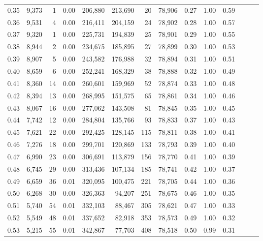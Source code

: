 \begin{tabular}{rrrrrrrrrrrrrr}
0.35 &  9,373 &      1 &  0.00 &  206,880 &  213,690 &      20 &  78,906 &  0.27 &  1.00 &      0.59 \\
0.36 &  9,531 &      4 &  0.00 &  216,411 &  204,159 &      24 &  78,902 &  0.28 &  1.00 &      0.57 \\
0.37 &  9,320 &      1 &  0.00 &  225,731 &  194,839 &      25 &  78,901 &  0.29 &  1.00 &      0.55 \\
0.38 &  8,944 &      2 &  0.00 &  234,675 &  185,895 &      27 &  78,899 &  0.30 &  1.00 &      0.53 \\
0.39 &  8,907 &      5 &  0.00 &  243,582 &  176,988 &      32 &  78,894 &  0.31 &  1.00 &      0.51 \\
0.40 &  8,659 &      6 &  0.00 &  252,241 &  168,329 &      38 &  78,888 &  0.32 &  1.00 &      0.49 \\
0.41 &  8,360 &     14 &  0.00 &  260,601 &  159,969 &      52 &  78,874 &  0.33 &  1.00 &      0.48 \\
0.42 &  8,394 &     13 &  0.00 &  268,995 &  151,575 &      65 &  78,861 &  0.34 &  1.00 &      0.46 \\
0.43 &  8,067 &     16 &  0.00 &  277,062 &  143,508 &      81 &  78,845 &  0.35 &  1.00 &      0.45 \\
0.44 &  7,742 &     12 &  0.00 &  284,804 &  135,766 &      93 &  78,833 &  0.37 &  1.00 &      0.43 \\
0.45 &  7,621 &     22 &  0.00 &  292,425 &  128,145 &     115 &  78,811 &  0.38 &  1.00 &      0.41 \\
0.46 &  7,276 &     18 &  0.00 &  299,701 &  120,869 &     133 &  78,793 &  0.39 &  1.00 &      0.40 \\
0.47 &  6,990 &     23 &  0.00 &  306,691 &  113,879 &     156 &  78,770 &  0.41 &  1.00 &      0.39 \\
0.48 &  6,745 &     29 &  0.00 &  313,436 &  107,134 &     185 &  78,741 &  0.42 &  1.00 &      0.37 \\
0.49 &  6,659 &     36 &  0.01 &  320,095 &  100,475 &     221 &  78,705 &  0.44 &  1.00 &      0.36 \\
0.50 &  6,268 &     30 &  0.00 &  326,363 &   94,207 &     251 &  78,675 &  0.46 &  1.00 &      0.35 \\
0.51 &  5,740 &     54 &  0.01 &  332,103 &   88,467 &     305 &  78,621 &  0.47 &  1.00 &      0.33 \\
0.52 &  5,549 &     48 &  0.01 &  337,652 &   82,918 &     353 &  78,573 &  0.49 &  1.00 &      0.32 \\
0.53 &  5,215 &     55 &  0.01 &  342,867 &   77,703 &     408 &  78,518 &  0.50 &  0.99 &      0.31 \\

\end{tabular}
